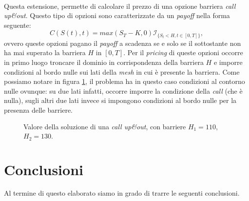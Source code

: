 \documentclass[a4paper,10pt]{report}
\theoremstyle{plain}
\theoremstyle{definition}
\theoremstyle{remark}
\begin{document}
\begin{description}[leftmargin=0cm]
 \item[\bf barrier\_extension]  \hfill \\ Questa estensione, permette di calcolare il prezzo di una opzione barriera \emph{call up\&out}. Questo tipo di opzioni sono caratterizzate da un \emph{payoff} nella forma seguente: $$C(S(t),t)=max(S_T-K,0)\mathcal{I}_{\{S_t<H, t\in[0,T]\}},$$ ovvero queste opzioni pagano il \emph{payoff} a scadenza se e solo se il sottostante non ha mai superato la barriera $H$ in $[0,T]$. Per il \emph{pricing} di queste opzioni occorre in primo luogo troncare il dominio in corrispondenza della barriera $H$ e imporre condizioni al bordo nulle sui lati della \emph{mesh} in cui \`e presente la barriera. Come possiamo notare in figura \ref{fig:barrier}, il problema ha in questo caso condizioni al contorno nulle ovunque: su due lati infatti, occorre imporre la condizione della \emph{call} (che \`e nulla), sugli altri due lati invece si impongono condizioni al bordo nulle per la presenza delle barriere.
 \begin{figure}[htp!]
\begin{center}
\caption{Valore della soluzione di una \emph{call up\&out}, con barriere $H_1=110$, $H_2=130$.}
\label{fig:barrier}
\end{center}
\end{figure}
\end{description}


\chapter{Conclusioni}
Al termine di questo elaborato siamo in grado di trarre le seguenti conclusioni.\\
\end{document}
